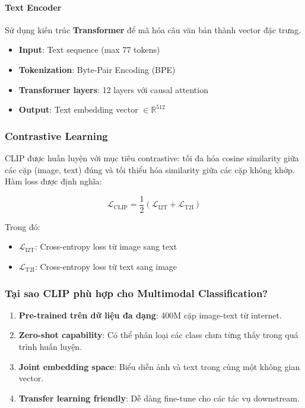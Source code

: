 \paragraph{Text Encoder}
Sử dụng kiến trúc \textbf{Transformer} để mã hóa câu văn bản thành vector đặc trưng.

\begin{itemize}
    \item \textbf{Input}: Text sequence (max 77 tokens)
    \item \textbf{Tokenization}: Byte-Pair Encoding (BPE)
    \item \textbf{Transformer layers}: 12 layers với causal attention
    \item \textbf{Output}: Text embedding vector $\in \mathbb{R}^{512}$
\end{itemize}

\subsubsection{Contrastive Learning}
CLIP được huấn luyện với mục tiêu contrastive: tối đa hóa cosine similarity giữa các cặp (image, text) đúng và tối thiểu hóa similarity giữa các cặp không khớp. Hàm loss được định nghĩa:

\begin{equation}
    \mathcal{L}_{\text{CLIP}} = \frac{1}{2}\left(\mathcal{L}_{\text{I2T}} + \mathcal{L}_{\text{T2I}}\right)
\end{equation}

Trong đó:
\begin{itemize}
    \item $\mathcal{L}_{\text{I2T}}$: Cross-entropy loss từ image sang text
    \item $\mathcal{L}_{\text{T2I}}$: Cross-entropy loss từ text sang image
\end{itemize}

\subsubsection{Tại sao CLIP phù hợp cho Multimodal Classification?}
\begin{enumerate}
    \item \textbf{Pre-trained trên dữ liệu đa dạng}: 400M cặp image-text từ internet.
    \item \textbf{Zero-shot capability}: Có thể phân loại các class chưa từng thấy trong quá trình huấn luyện.
    \item \textbf{Joint embedding space}: Biểu diễn ảnh và text trong cùng một không gian vector.
    \item \textbf{Transfer learning friendly}: Dễ dàng fine-tune cho các tác vụ downstream.
\end{enumerate}

